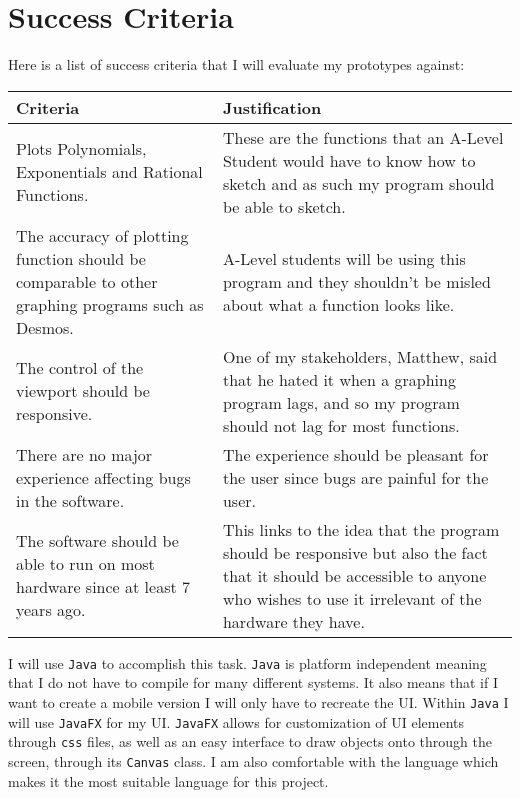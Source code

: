 \documentclass[../../../main.tex]{subfiles}
\begin{document}
\chapter{Success Criteria}
Here is a list of success criteria that I will evaluate my prototypes against:
\begin{table}[H]
\centering
\begin{tabular}{|C{0.3\textwidth}|C{0.6\textwidth}|}
\hline
Criteria                                                                        & Justification                                                                                                                                                                    \\ \hline
Plots Polynomials, Exponentials and Rational Functions.                         & These are the functions that an A-Level Student would have to know how to sketch and as such my program should be able to sketch.                                                \\ \hline
The accuracy of plotting function should be comparable to other graphing programs such as Desmos.                & A-Level students will be using this program and they shouldn't be misled about what a function looks like.                                                                       \\ \hline
The control of the viewport should be responsive.                               & One of my stakeholders, Matthew, said that he hated it when a graphing program lags, and so my program should not lag for most functions.                                        \\ \hline
There are no major experience affecting bugs in the software.                   & The experience should be pleasant for the user since bugs are painful for the user.                                                                                                \\ \hline
The software should be able to run on most hardware since at least 7 years ago. & This links to the idea that the program should be responsive but also the fact that it should be accessible to anyone who wishes to use it irrelevant of the hardware they have. \\ \hline
\end{tabular}
\end{table}
I will use \texttt{Java} to accomplish this task. \texttt{Java} is platform independent meaning that I do not have to compile for many different systems. It also means that if I want to create a mobile version I will only have to recreate the UI. Within \texttt{Java} I will use \texttt{JavaFX} for my UI. \texttt{JavaFX} allows for customization of UI elements through \texttt{css} files, as well as an easy interface to draw objects onto through the screen, through its \texttt{Canvas} class.  I am also comfortable with the language which makes it the most suitable language for this project.
\end{document}
